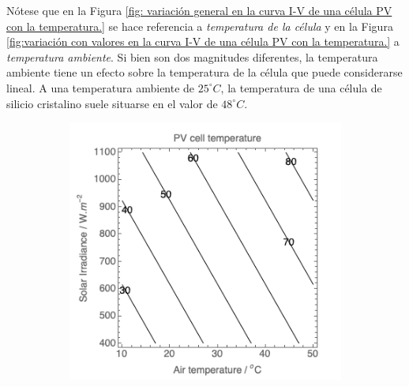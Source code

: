 \documentclass[12pt]{article}
\begin{document}
	\noindent Nótese que en la Figura \ref{fig: variación general en la curva I-V de una célula PV con la temperatura.} se hace referencia a \textit{temperatura de la célula} y en la Figura \ref{fig:variación con valores en la curva I-V de una célula PV con la temperatura.} a \textit{temperatura ambiente}. Si bien son dos magnitudes diferentes, la temperatura ambiente tiene un efecto sobre la temperatura de la célula que puede considerarse lineal. A una temperatura ambiente de $25^{\circ}C$, la temperatura de una célula de silicio cristalino suele situarse en el valor de $48^{\circ}C$. \\
	
	\begin{figure}[h]
		\begin{subfigure}{0.52\textwidth}
			\includegraphics[width=1\textwidth]{img/PVcellTemp_AirTemp.png} 
			\caption{}
			\label{fig: solar cell temp vs air temp.}
		\end{subfigure}
		\begin{subfigure}{0.55\textwidth}

\end{subfigure}
\end{figure}
\end{document}
